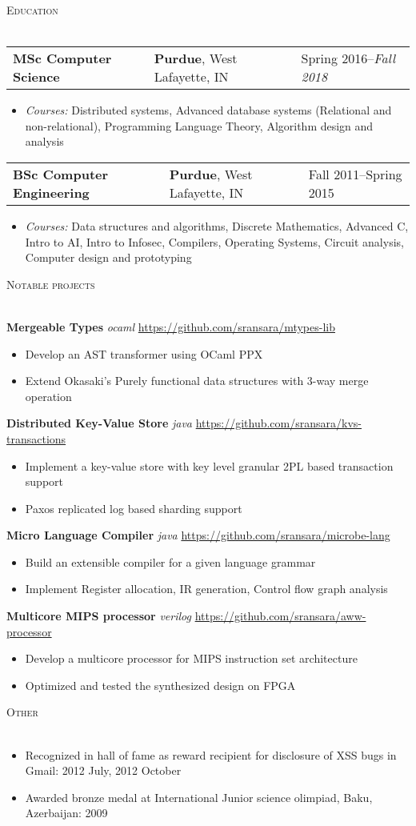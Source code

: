 \documentclass[a4paper]{article}
\newcommand{\header} [1] {
    {\hspace*{-18pt}\vspace*{6pt} \textsc{#1}
    \vspace*{-14pt} \\ \hspace*{-18pt} \hrulefill{} \\
    \vspace{1mm}}
}
\newcommand{\threeparts} [3] {
    {\setlength\tabcolsep{0pt}
    \begin{tabularx}{\linewidth}{L{.40\linewidth}L{.35\linewidth}R{.25\linewidth}} 
    \textbf{#1}&#2&#3
    \end{tabularx}}
}
\begin{document}
\header{Education}
\threeparts{MSc Computer Science}{\textbf{Purdue}, West Lafayette, IN}{Spring 2016--\textit{Fall 2018}}
\begin{itemize}[label=$\square$]
	\item \textit{Courses:} Distributed systems, Advanced database systems (Relational and non-relational), Programming Language Theory, Algorithm design and analysis
\end{itemize}
\threeparts{BSc Computer Engineering}{\textbf{Purdue}, West Lafayette, IN}{Fall 2011--Spring 2015}
\begin{itemize}[label=$\square$]
	\item \textit{Courses:} Data structures and algorithms, Discrete Mathematics, Advanced C, Intro to AI, Intro to Infosec, Compilers, Operating Systems, Circuit analysis, Computer design and prototyping
\end{itemize}


\header{Notable projects}
{\textbf{Mergeable Types}} {\sl ocaml\/} \hfill \url{https://github.com/sransara/mtypes-lib}
\begin{itemize}[label=$\square$]
	\item Develop an AST transformer using OCaml PPX
	\item Extend Okasaki's Purely functional data structures with 3-way merge operation
\end{itemize}
{\textbf{Distributed Key-Value Store}} {\sl java\/} \hfill \url{https://github.com/sransara/kvs-transactions}
\begin{itemize}[label=$\square$]
	\item Implement a key-value store with key level granular 2PL based transaction support
	\item Paxos replicated log based sharding support
\end{itemize}
{\textbf{Micro Language Compiler}} {\sl java\/} \hfill \url{https://github.com/sransara/microbe-lang}
\begin{itemize}[label=$\square$]
	\item Build an extensible compiler for a given language grammar
	\item Implement Register allocation, IR generation, Control flow graph analysis
\end{itemize}
{\textbf{Multicore MIPS processor}} {\sl verilog\/} \hfill \url{https://github.com/sransara/aww-processor}
\begin{itemize}[label=$\square$]
    \item Develop a multicore processor for MIPS instruction set architecture
    \item Optimized and tested the synthesized design on FPGA 
\end{itemize}

\header{Other}
\begin{itemize}[label=$\square$]
	\item Recognized in hall of fame as reward recipient for disclosure of XSS bugs in Gmail: 2012 July, 2012 October
	\item Awarded bronze medal at International Junior science olimpiad, Baku, Azerbaijan: 2009
\end{itemize}
\end{document}
